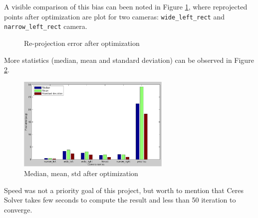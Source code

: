 A visible comparison of this bias can been noted in Figure \ref{fig:reprojection}, where reprojected points after optimization are plot for two cameras: \texttt{wide\_left\_rect} and \texttt{narrow\_left\_rect} camera.
\begin{figure}[!htbp]
  \centering
  \caption{Re-projection error after optimization}
  \label{fig:reprojection}
\end{figure}



More statistics (median, mean and standard deviation) can be observed in Figure \ref{fig:stats}.
\begin{figure}[!htbp]
 \centering
 \includegraphics[width=0.65\textwidth]{images/stats.pdf}
 \caption{Median, mean, std after optimization}
 \label{fig:stats}
\end{figure}


Speed was not a priority goal of this project, but worth to mention that Ceres Solver takes few seconds to compute the result and less than 50 iteration to converge.


